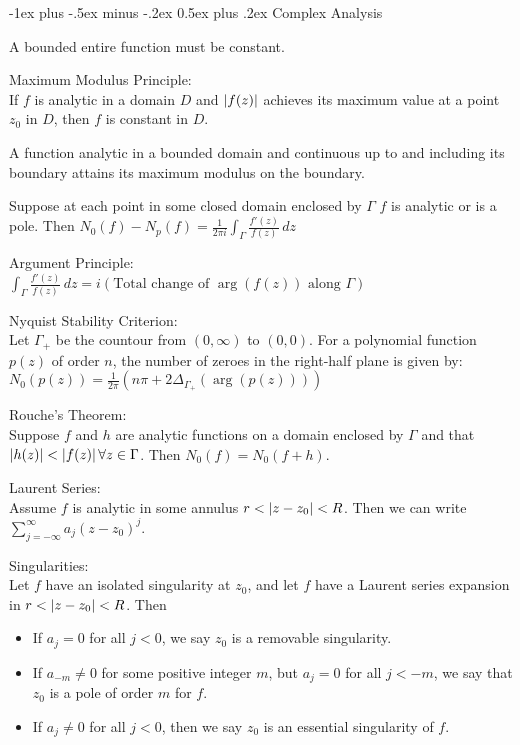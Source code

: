 \documentclass[12pt,landscape]{article}
\makeatletter
\renewcommand{\section}{\@startsection{section}{1}{0mm}%
                                {-1ex plus -.5ex minus -.2ex}%
                                {0.5ex plus .2ex}%
                                {\normalfont\normalsize\bfseries}}
\newcommand{\tab}{\hspace{.02\textwidth}}
\newcommand{\ds}{\displaystyle}
\theoremstyle{definition}
\makeatother
\begin{document}
\begin{multicols}{3}
\section{Complex Analysis}
\begin{theorem}
	A bounded entire function must be constant.
\end{theorem}

Maximum Modulus Principle:\\
\tab If $f$ is analytic in a domain $D$ and $\abs{f(z)}$ achieves its maximum value at a point $z_0$ in $D$, then $f$ is constant in $D$.

\begin{theorem}
	A function analytic in a bounded domain and continuous up to and including its boundary attains its maximum modulus on the boundary.
\end{theorem}

\begin{theorem}
	Suppose at each point in some closed domain enclosed by $\Gamma$ $f$ is analytic or is a pole. Then $\ds N_0(f) - N_p(f)= \frac{1}{2\pi i}\int_{\Gamma}\frac{f'(z)}{f(z)}\,dz$
\end{theorem}

Argument Principle:\\
\tab $\ds \int_{\Gamma}\frac{f'(z)}{f(z)}\,dz = i(\text{Total change of }\arg(f(z))\text{ along }\Gamma)$

Nyquist Stability Criterion:\\
\tab Let $\Gamma_+$ be the countour from $(0, \infty)$ to $(0,0)$. For a polynomial function $p(z)$ of order $n$, the number of zeroes in the right-half plane is given by:\\
\tab $\ds N_0(p(z)) = \frac{1}{2\pi}\left(n\pi + 2\Delta_{\Gamma_+}(\arg(p(z)))\right)$

Rouche's Theorem:\\
\tab Suppose $f$ and $h$ are analytic functions on a domain enclosed by $\Gamma$ and that $\abs{h(z)} < \abs{f(z)} \, \forall z \in \Gamma$. Then $N_0(f) = N_0(f + h)$.  

Laurent Series:\\
\tab Assume $f$ is analytic in some annulus $r < \abs{z - z_0} < R$. Then we can write $\ds \sum_{j=-\infty}^{\infty}a_j(z-z_0)^j$.

Singularities:\\
\tab Let $f$ have an isolated singularity at $z_0$, and let $f$ have a Laurent series expansion in $r < \abs{z - z_0} < R$. Then
\begin{itemize}[leftmargin=2em]
	\itemsep0em
	\item If $a_j = 0$ for all $j < 0$, we say $z_0$ is a removable singularity.
	\item If $a_{-m}\neq0 $ for some positive integer $m$, but $a_j = 0$ for all $j < -m$, we say that $z_0$ is a pole of order $m$ for $f$.
	\item If $a_j \neq 0$ for all $j < 0$, then we say $z_0$ is an essential singularity of $f$.
\end{itemize}


\end{multicols}
\end{document}
